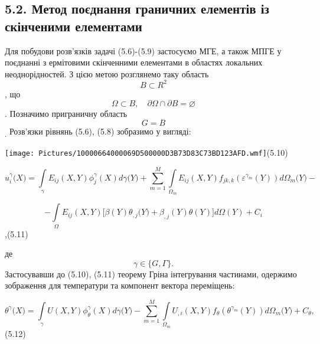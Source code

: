 \hypertarget{ux43cux435ux442ux43eux434-ux43fux43eux454ux434ux43dux430ux43dux43dux44f-ux433ux440ux430ux43dux438ux447ux43dux438ux445-ux435ux43bux435ux43cux435ux43dux442ux456ux432-ux456ux437-ux441ux43aux456ux43dux447ux435ux43dux438ux43cux438-ux435ux43bux435ux43cux435ux43dux442ux430ux43cux438-1}{%
\subsection[5.2. Метод поєднання граничних елементів із скінченими
елементами]{\texorpdfstring{\protect\hypertarget{anchor-62}{}{}5.2.
Метод поєднання граничних елементів із скінченими
елементами}{5.2. Метод поєднання граничних елементів із скінченими елементами}}\label{ux43cux435ux442ux43eux434-ux43fux43eux454ux434ux43dux430ux43dux43dux44f-ux433ux440ux430ux43dux438ux447ux43dux438ux445-ux435ux43bux435ux43cux435ux43dux442ux456ux432-ux456ux437-ux441ux43aux456ux43dux447ux435ux43dux438ux43cux438-ux435ux43bux435ux43cux435ux43dux442ux430ux43cux438-1}}

Для побудови розв'язків задачі (5.6)-(5.9) застосуємо МГЕ, а також МПГЕ
у поєднанні з ермітовими скінченними елементами в областях локальних
неоднорідностей. З цією метою розглянемо таку область
\[{B\subset R^{2}}{}\], що
\[{\Omega\subset B,\quad\partial{\Omega \cap \partial}{B = \varnothing}}{}\].
Позначимо приграничну область \[{G = B}{}\]\textsubscript{. }Розв'язки
рівнянь (5.6), (5.8) зобразимо у вигляді:

\texttt{[image: Pictures/10000664000069D500000D3B73D83C73BD123AFD.wmf]}(5.10)

\[{u_{i}^{\gamma}(X{) = {\int\limits_{\gamma}{E_{\mathit{\text{ij}}}(X,Y)\phi_{j}^{\gamma}(X)\mathit{d\gamma}(Y{) + {\sum\limits_{m = 1}^{M}{\int\limits_{\Omega_{m}}{E_{\mathit{\text{ij}}}(X,Y)f_{\mathit{\text{jk}},k}(\varepsilon^{\gamma_{m}}(Y))d\Omega_{m}{(Y{) -}}}}}}}}}}{}\]

\[{{- {\int\limits_{\Omega}{E_{\mathit{\text{ij}}}(X,Y)\lbrack\beta(Y)\theta_{,j}(Y{) + \beta_{,j}}(Y)\theta(Y)\rbrack d\Omega(Y)}}} + C_{i}}{}\],(5.11)

де \[{\gamma\in{\{{G,\Gamma}\}}\text{.}}{}\]\textsubscript{
}Застосувавши до (5.10), (5.11) теорему Гріна інтегрування частинами,
одержимо зображення для температури та компонент вектора переміщень:

\[{\theta^{\gamma}(X{) = {\int\limits_{\gamma}{U(X,Y)\phi_{\theta}^{\gamma}(X)\mathit{d\gamma}(Y{) - {\sum\limits_{m = 1}^{M}{{\int\limits_{\Omega_{m}}{U_{,i}(X,Y)f_{\theta}(\theta^{\gamma_{m}}(Y))d\Omega_{m}{(Y{) + C_{\theta}}}}},}}}}}}}{}\]
(5.12)

